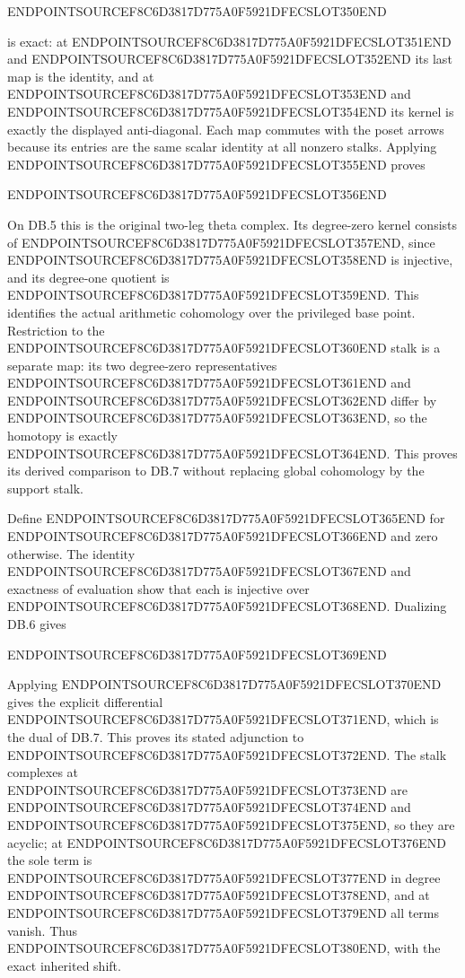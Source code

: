 ENDPOINTSOURCEF8C6D3817D775A0F5921DFECSLOT350END

is exact: at ENDPOINTSOURCEF8C6D3817D775A0F5921DFECSLOT351END and ENDPOINTSOURCEF8C6D3817D775A0F5921DFECSLOT352END its last map is the identity, and at ENDPOINTSOURCEF8C6D3817D775A0F5921DFECSLOT353END and ENDPOINTSOURCEF8C6D3817D775A0F5921DFECSLOT354END its kernel is exactly the displayed anti-diagonal. Each map commutes with the poset arrows because its entries are the same scalar identity at all nonzero stalks. Applying ENDPOINTSOURCEF8C6D3817D775A0F5921DFECSLOT355END proves

ENDPOINTSOURCEF8C6D3817D775A0F5921DFECSLOT356END

On DB.5 this is the original two-leg theta complex. Its degree-zero kernel consists of ENDPOINTSOURCEF8C6D3817D775A0F5921DFECSLOT357END, since ENDPOINTSOURCEF8C6D3817D775A0F5921DFECSLOT358END is injective, and its degree-one quotient is ENDPOINTSOURCEF8C6D3817D775A0F5921DFECSLOT359END. This identifies the actual arithmetic cohomology over the privileged base point. Restriction to the ENDPOINTSOURCEF8C6D3817D775A0F5921DFECSLOT360END stalk is a separate map: its two degree-zero representatives ENDPOINTSOURCEF8C6D3817D775A0F5921DFECSLOT361END and ENDPOINTSOURCEF8C6D3817D775A0F5921DFECSLOT362END differ by ENDPOINTSOURCEF8C6D3817D775A0F5921DFECSLOT363END, so the homotopy is exactly ENDPOINTSOURCEF8C6D3817D775A0F5921DFECSLOT364END. This proves its derived comparison to DB.7 without replacing global cohomology by the support stalk.

Define ENDPOINTSOURCEF8C6D3817D775A0F5921DFECSLOT365END for ENDPOINTSOURCEF8C6D3817D775A0F5921DFECSLOT366END and zero otherwise. The identity ENDPOINTSOURCEF8C6D3817D775A0F5921DFECSLOT367END and exactness of evaluation show that each is injective over ENDPOINTSOURCEF8C6D3817D775A0F5921DFECSLOT368END. Dualizing DB.6 gives

ENDPOINTSOURCEF8C6D3817D775A0F5921DFECSLOT369END

Applying ENDPOINTSOURCEF8C6D3817D775A0F5921DFECSLOT370END gives the explicit differential ENDPOINTSOURCEF8C6D3817D775A0F5921DFECSLOT371END, which is the dual of DB.7. This proves its stated adjunction to ENDPOINTSOURCEF8C6D3817D775A0F5921DFECSLOT372END. The stalk complexes at ENDPOINTSOURCEF8C6D3817D775A0F5921DFECSLOT373END are ENDPOINTSOURCEF8C6D3817D775A0F5921DFECSLOT374END and ENDPOINTSOURCEF8C6D3817D775A0F5921DFECSLOT375END, so they are acyclic; at ENDPOINTSOURCEF8C6D3817D775A0F5921DFECSLOT376END the sole term is ENDPOINTSOURCEF8C6D3817D775A0F5921DFECSLOT377END in degree ENDPOINTSOURCEF8C6D3817D775A0F5921DFECSLOT378END, and at ENDPOINTSOURCEF8C6D3817D775A0F5921DFECSLOT379END all terms vanish. Thus ENDPOINTSOURCEF8C6D3817D775A0F5921DFECSLOT380END, with the exact inherited shift.

